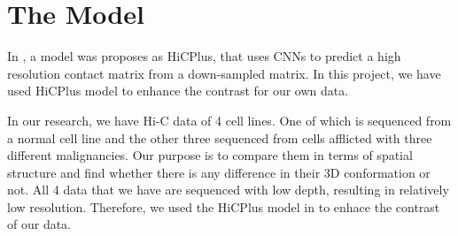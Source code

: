\documentclass{article}
\begin{document}
\section{The Model}
In \cite{zhang2018enhancing}, a model was
proposes as HiCPlus, that uses CNNs
to predict a high resolution contact
matrix from a down-sampled matrix.
In this project, we have used HiCPlus
model to enhance the contrast for 
our own data. 

In our research, we have Hi-C data of
4 cell lines. One of which is sequenced
from a normal cell line and the other
three sequenced from cells afflicted
with three different malignancies.
Our purpose is to
compare them in terms of spatial
structure and find whether there is 
any difference in their 3D conformation
or not.
All 4 data that we have are sequenced
with low depth, resulting in relatively
low resolution. Therefore, we used the
HiCPlus model in \cite{zhang2018enhancing}
to enhace the contrast of our data.
\end{document}
